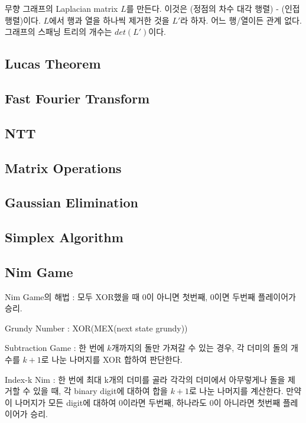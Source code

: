 \documentclass[8pt,landscape,a4paper,twocolumn]{article}
\begin{document}
무향 그래프의 Laplacian matrix $L$를 만든다. 이것은 (정점의 차수 대각 행렬) - (인접행렬)이다.
$L$에서 행과 열을 하나씩 제거한 것을 $L'$라 하자. 어느 행/열이든 관계 없다.
그래프의 스패닝 트리의 개수는 $det(L')$이다.

\subsection{Lucas Theorem}


\subsection{Fast Fourier Transform}


\subsection{NTT}


\subsection{Matrix Operations}


\subsection{Gaussian Elimination}


\subsection{Simplex Algorithm}


\subsection{Nim Game}

Nim Game의 해법 : 모두 XOR했을 때 $0$이 아니면 첫번째, $0$이면 두번째 플레이어가 승리.

Grundy Number : XOR(MEX({next state grundy}))

Subtraction Game : 한 번에 $k$개까지의 돌만 가져갈 수 있는 경우,
각 더미의 돌의 개수를 $k + 1$로 나눈 나머지를 XOR 합하여 판단한다.

Index-k Nim : 한 번에 최대 k개의 더미를 골라 각각의 더미에서 아무렇게나 돌을
제거할 수 있을 때, 각 binary digit에 대하여 합을 $k + 1$로 나눈 나머지를 계산한다.
만약 이 나머지가 모든 digit에 대하여 $0$이라면 두번째, 하나라도 $0$이 아니라면
첫번째 플레이어가 승리.
\end{document}
